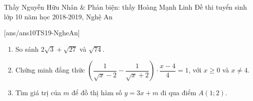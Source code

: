 \begin{name}
{Thầy Nguyễn Hữu Nhân \& Phản biện: thầy Hoàng Mạnh Linh}
{Đề thi tuyển sinh lớp 10 năm học 2018-2019, Nghệ An}
\end{name}
\setcounter{ex}{0}
[ans/ans10TS19-NgheAn]
\begin{ex}%
	\begin{enumerate}
		\item So sánh $2\sqrt{3}+\sqrt{27}$ và $\sqrt{74}$.
		\item Chứng minh đẳng thức $\left( \dfrac{1}{\sqrt{x}-2} - \dfrac{1}{\sqrt{x}+2} \right) \cdot \dfrac{x-4}{4}=1 $, với $x \ge 0$ và $x \neq 4$.
		\item Tìm giá trị của $m$ để đồ thị hàm số $y=3x+m$ đi qua điểm $A(1;2)$.
	\end{enumerate}
\end{ex}

